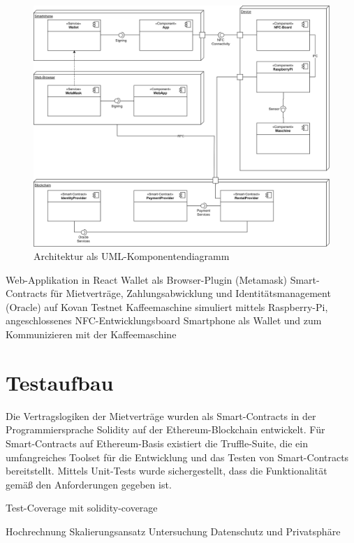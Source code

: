 \begin{figure}[h]
 \centering
 \includegraphics[width=1.0\textwidth]{gfx/Architecture.png}
 \caption{Architektur als UML-Komponentendiagramm}
 \label{fig:chapter07:architecture}
\end{figure}

Web-Applikation in React
Wallet als Browser-Plugin (Metamask)
Smart-Contracts für Mietverträge, Zahlungsabwicklung und Identitätsmanagement (Oracle) auf Kovan Testnet
Kaffeemaschine simuliert mittels Raspberry-Pi, angeschlossenes NFC-Entwicklungsboard
Smartphone als Wallet und zum Kommunizieren mit der Kaffeemaschine


\section{Testaufbau}
\label{subsec:implementation:poc:testing}
Die Vertragslogiken der Mietverträge wurden als Smart-Contracts in der Programmiersprache Solidity auf der Ethereum-Blockchain entwickelt. Für Smart-Contracts auf Ethereum-Basis existiert die Truffle-Suite, die ein umfangreiches Toolset für die Entwicklung und das Testen von Smart-Contracts bereitstellt. Mittels Unit-Tests wurde sichergestellt, dass die Funktionalität gemäß den Anforderungen gegeben ist.

Test-Coverage mit solidity-coverage

Hochrechnung Skalierungsansatz
Untersuchung Datenschutz und Privatsphäre

